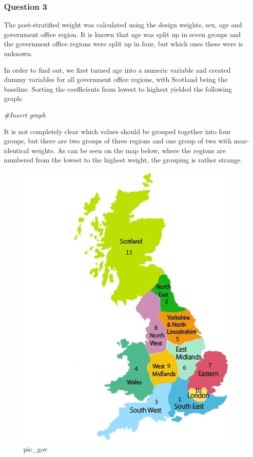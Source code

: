 \documentclass[]{article}
\newenvironment{Shaded}{\begin{snugshade}}{\end{snugshade}}
\newcommand{\CommentTok}[1]{\textcolor[rgb]{0.56,0.35,0.01}{\textit{#1}}}
\begin{document}
\subsubsection{Question 3}\label{question-3}

The post-stratified weight was calculated using the design weights, sex,
age and government office region. It is known that age was split up in
seven groups and the government office regions were split up in four,
but which ones these were is unknown.

In order to find out, we first turned age into a numeric variable and
created dummy variables for all government office regions, with Scotland
being the baseline. Sorting the coefficients from lowest to highest
yielded the following graph:

\begin{Shaded}
\begin{Highlighting}[]
\CommentTok{#Insert graph}
\end{Highlighting}
\end{Shaded}

It is not completely clear which values should be grouped together into
four groups, but there are two groups of three regions and one group of
two with near-identical weights. As can be seen on the map below, where
the regions are numbered from the lowest to the highest weight, the
grouping is rather strange.

\begin{figure}
\centering
\includegraphics{GOR.png}
\caption{pic\_gov}
\end{figure}
\end{document}
